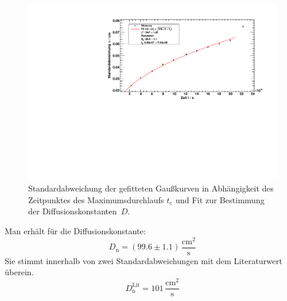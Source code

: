 \begin{figure}[H]
\begin{center}
  \includegraphics[width=\textwidth]{../img/part2/dist_fitSigma.pdf}
  \caption{Standardabweichung der gefitteten Gaußkurven in Abhängigkeit des Zeitpunktes des Maximumsdurchlaufs $t{_\text{c}}$
  und Fit zur Bestimmung der Diffusionskonstanten~$D$.}
  \label{img:dist:fitsigma}
\end{center}
\end{figure}
Man erhält für die Diffusionskonstante:
\begin{equation}
  D_\text{n} = (99.6 \pm 1.1)\,\frac{\text{cm}^2}{\text{s}}
\end{equation}
Sie stimmt innerhalb von zwei Standardabweichungen mit dem Literaturwert überein. 
\begin{equation}
  D_\text{n}^{\text{Lit}} = 101\,\frac{\text{cm}^2}{\text{s}} 
\end{equation}

